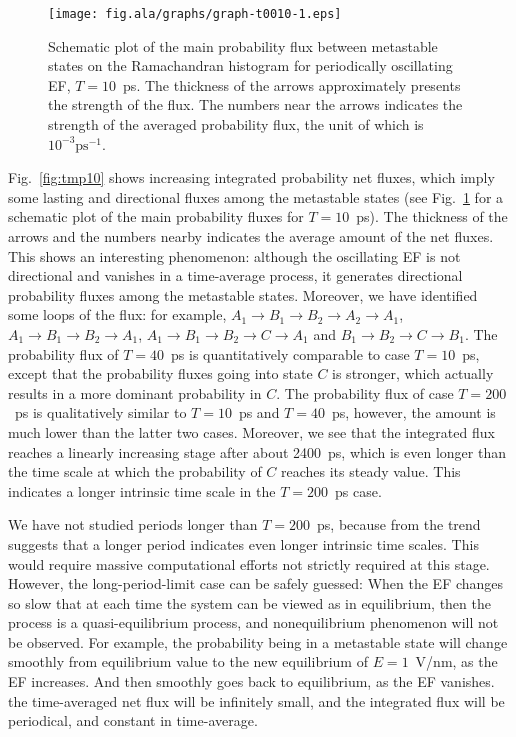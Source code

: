 \documentclass[a4paper,preprint,unsortedaddress,onecolumn]{revtex4-1}
\begin{document}
\begin{figure}
  \centering
  \texttt{[image: fig.ala/graphs/graph-t0010-1.eps]}
  \caption{Schematic plot of the main probability flux between metastable
    states on the Ramachandran histogram
    for periodically oscillating EF, $T=10$~ps. The thickness 
    of the arrows approximately presents the strength of the flux.
    The numbers near the arrows indicates the strength of the averaged
    probability flux, the unit of which is $10^{-3}\textrm{ps}^{-1}$.
  }
  \label{fig:tmp11}
\end{figure}
Fig.~\ref{fig:tmp10} shows increasing
integrated probability net fluxes, which imply some lasting and directional
fluxes among the metastable states (see Fig.~\ref{fig:tmp11} for a schematic plot of the main probability
fluxes for $T=10$~ps).
The thickness of the arrows and the numbers nearby indicates
the average amount of the net fluxes.
This shows an interesting phenomenon: although
the oscillating EF is not directional and vanishes in a time-average process,
it generates directional probability fluxes among the metastable states.
Moreover, we have identified some loops of the flux: for example, $A_1 \rightarrow B_1
\rightarrow B_2 \rightarrow A_2 \rightarrow A_1$, $A_1 \rightarrow B_1
\rightarrow B_2 \rightarrow A_1$,  $A_1 \rightarrow B_1
\rightarrow B_2 \rightarrow C \rightarrow A_1$ and $B_1
\rightarrow B_2 \rightarrow C \rightarrow B_1$.
The probability flux of $T=40$~ps is quantitatively
comparable to case $T=10$~ps, except that the probability fluxes
going into state $C$ is stronger, which actually results in
a more dominant probability in $C$.
The probability flux of case $T=200$~ps is qualitatively
similar to $T=10$~ps and $T=40$~ps, however,
the amount is much lower than the latter two cases.
Moreover, we see that the integrated flux reaches a linearly increasing
stage after about 2400~ps, which is even longer than the time scale
at which the probability of $C$ reaches its steady value. This indicates
a longer intrinsic time scale in the $T=200$~ps case.

We have not studied periods longer than $T=200$~ps, because
from the trend suggests that a longer period indicates even longer intrinsic time scales.
This would require massive computational efforts not strictly required at this stage.
However, the long-period-limit case can be safely guessed: When
the EF changes so slow that at each time the system
can be viewed as in equilibrium, then the process is a quasi-equilibrium
process, and nonequilibrium phenomenon will not be observed. For example,
the probability being in a  metastable state will change
smoothly from equilibrium value to the new equilibrium of $E=1$~V/nm, as
the EF increases.
And then smoothly goes back to equilibrium, as the EF vanishes.
the time-averaged net flux will be infinitely small,
and the integrated flux will be periodical, and constant in time-average.
\end{document}
